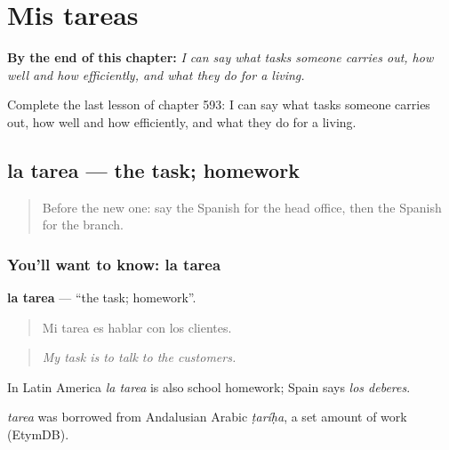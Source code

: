 
\chapter{Mis tareas}
\label{ch:es-mis-tareas}

\begin{chapteropening}
\textbf{By the end of this chapter:} \emph{I can say what tasks someone carries out, how well and how efficiently, and what they do for a living.}

Complete the last lesson of chapter 593: I can say what tasks someone carries out, how well and how efficiently, and what they do for a living.
\end{chapteropening}

\section[la tarea]{la tarea — the task; homework}

\label{lesson:ES-C593-tarea}



\begin{quote}
Before the new one: say the Spanish for the head office, then the Spanish for the branch.
\end{quote}

\subsection*{You'll want to know: la tarea}
\textbf{la tarea} — \textquotedblleft{}the task; homework\textquotedblright{}.

\begin{quote}
Mi tarea es hablar con los clientes.
\end{quote}

\begin{quote}
\emph{My task is to talk to the customers.}
\end{quote}

In Latin America \emph{la tarea} is also school homework; Spain says \emph{los deberes}.

\begin{cousinweb}
\emph{tarea} was borrowed from Andalusian Arabic \emph{ṭaríḥa}, a set amount of work (EtymDB).
\end{cousinweb}

